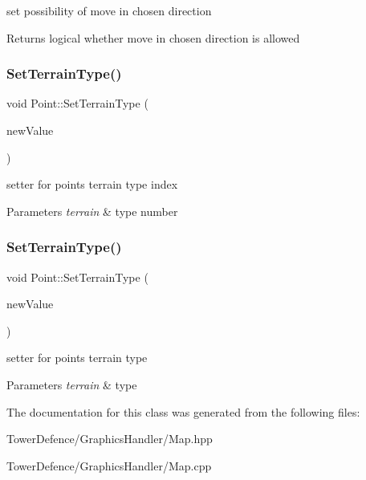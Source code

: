 set possibility of move in chosen direction 

\begin{DoxyReturn}{Returns}
logical whether move in chosen direction is allowed 
\end{DoxyReturn}
\mbox{\label{class_point_aac7fb5fc8d1d5950f8ad7c8577ed2d65}} 
\subsubsection{\texorpdfstring{Set\+Terrain\+Type()}{SetTerrainType()}\hspace{0.1cm}{\footnotesize\ttfamily [1/2]}}
{\footnotesize\ttfamily void Point\+::\+Set\+Terrain\+Type (\begin{DoxyParamCaption}\item[{int}]{new\+Value }\end{DoxyParamCaption})}



setter for point\textquotesingle{}s terrain type index 


\begin{DoxyParams}{Parameters}
{\em terrain} & type number \\
\hline
\end{DoxyParams}
\mbox{\label{class_point_a226ab770c8f00be177167818821df9dc}} 
\subsubsection{\texorpdfstring{Set\+Terrain\+Type()}{SetTerrainType()}\hspace{0.1cm}{\footnotesize\ttfamily [2/2]}}
{\footnotesize\ttfamily void Point\+::\+Set\+Terrain\+Type (\begin{DoxyParamCaption}\item[{Terrain\+Type}]{new\+Value }\end{DoxyParamCaption})}



setter for point\textquotesingle{}s terrain type 


\begin{DoxyParams}{Parameters}
{\em terrain} & type \\
\hline
\end{DoxyParams}


The documentation for this class was generated from the following files\+:\begin{DoxyCompactItemize}
\item 
Tower\+Defence/\+Graphics\+Handler/Map.\+hpp\item 
Tower\+Defence/\+Graphics\+Handler/Map.\+cpp\end{DoxyCompactItemize}
